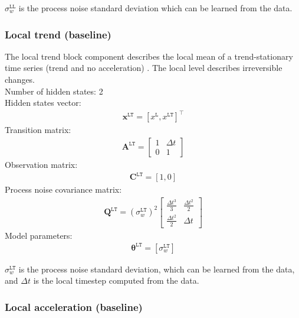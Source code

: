 \noindent
$\sigma_{w}^{\mathtt{LL}}$ is the process noise standard deviation which can be learned from the data.

\subsubsection{Local trend (baseline)}

The local trend block component describes the local mean of a trend-stationary time series (trend and no acceleration) \cite{STC:STC2035}. 
The local level describes irreversible changes.\\

\noindent
Number of hidden states: 2\\

Hidden states vector: 
\begin{gather*}
 \mathbf{x}^{\mathtt{LT}} = [x^{\mathtt{L}}, x^{\mathtt{LT}}]^{\intercal}
 \end{gather*}
Transition matrix: 
\begin{gather*}
\mathbf{A}^{\mathtt{LT}}= \left[\begin{array}{cc}1 &\Delta t\\0&1\end{array}\right]
\end{gather*}
Observation matrix: 
\begin{gather*}
\mathbf{C}^{\mathtt{LT}}=[1, 0]
\end{gather*}
Process noise covariance matrix: 
\begin{gather*}
\mathbf{Q}^{\mathtt{LT}}= (\sigma_{w}^{\mathtt{LT}})^{2}\left[\begin{array}{cc}\tfrac{\Delta t^{3}}{3} &\tfrac{\Delta t^{2}}{2}\\\tfrac{\Delta t^{2}}{2}&\Delta t\end{array}\right]
\end{gather*}
Model parameters: 
\begin{gather*}
\bm\theta^{\mathtt{LT}}=[\sigma_{w}^{\mathtt{LT}} ]
\end{gather*}

\noindent
$\sigma_{w}^{\mathtt{LT}}$ is the process noise standard deviation, which can be learned from the data, and $\Delta t$ is the local timestep computed from the data.


\subsubsection{Local acceleration (baseline)}

